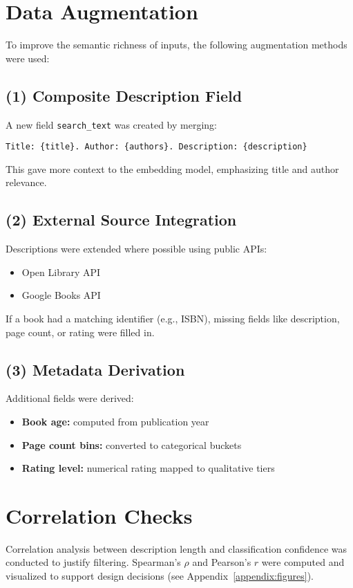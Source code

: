 \section{Data Augmentation}
To improve the semantic richness of inputs, the following augmentation methods were used:

\subsection*{(1) Composite Description Field}
A new field \texttt{search\_text} was created by merging:

\begin{verbatim}
Title: {title}. Author: {authors}. Description: {description}
\end{verbatim}

This gave more context to the embedding model, emphasizing title and author relevance.

\subsection*{(2) External Source Integration}
Descriptions were extended where possible using public APIs:

\begin{itemize}
    \item Open Library API
    \item Google Books API
\end{itemize}

If a book had a matching identifier (e.g., ISBN), missing fields like description, page count, or rating were filled in.

\subsection*{(3) Metadata Derivation}
Additional fields were derived:
\begin{itemize}
    \item \textbf{Book age:} computed from publication year
    \item \textbf{Page count bins:} converted to categorical buckets
    \item \textbf{Rating level:} numerical rating mapped to qualitative tiers
\end{itemize}

\section{Correlation Checks}
Correlation analysis between description length and classification confidence was conducted to justify filtering. Spearman’s \( \rho \) and Pearson’s \( r \) were computed and visualized to support design decisions (see Appendix~\ref{appendix:figures}).

